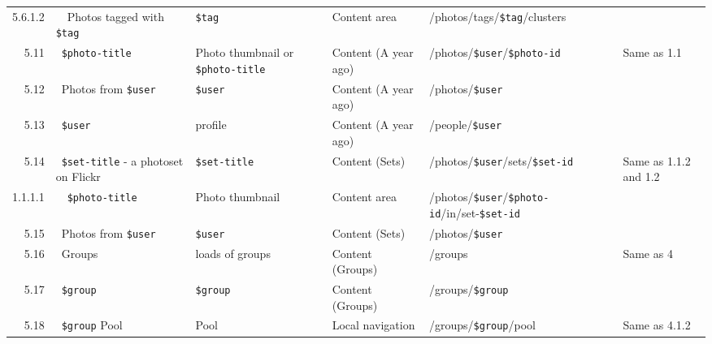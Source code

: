 \documentclass[12pt,a4paper]{article}
\newcommand{\var}[1]{\texttt{\${#1}}}
\begin{document}
\begin{landscape}
\begin{table}[h!b!p!]
\begin{center}
\begin{tiny}
\begin{tabular}{r|l|l|l|l|p{3cm}}
                5.6.1.2 &
                ~~Photos tagged with \var{tag} &
                \var{tag} &
                Content area &
                /photos/tags/\var{tag}/clusters &
                \\

              5.11 &
              ~\var{photo-title} &
              Photo thumbnail or \var{photo-title} &
              Content (A year ago) &
              /photos/\var{user}/\var{photo-id} &
              Same as 1.1 \\

              5.12 &
              ~Photos from \var{user} &
              \var{user} &
              Content (A year ago) &
              /photos/\var{user} &
              \\

              5.13 &
              ~\var{user} &
              profile &
              Content (A year ago) &
              /people/\var{user} &
              \\

              5.14 &
              ~\var{set-title} - a photoset on Flickr &
              \var{set-title} &
              Content (Sets) &
              /photos/\var{user}/sets/\var{set-id} &
              Same as 1.1.2 and 1.2 \\

                1.1.1.1 &
                ~~\var{photo-title} &
                Photo thumbnail &
                Content area &
                /photos/\var{user}/\var{photo-id}/in/set-\var{set-id} &
                \\

              5.15 &
              ~Photos from \var{user} &
              \var{user} &
              Content (Sets) &
              /photos/\var{user} &
              \\

              5.16 &
              ~Groups &
              loads of groups &
              Content (Groups) &
              /groups &
              Same as 4\\

              5.17 &
              ~\var{group} &
              \var{group} &
              Content (Groups) &
              /groups/\var{group} &
              \\

              5.18 &
              ~\var{group} Pool &
              Pool &
              Local navigation &
              /groups/\var{group}/pool &
              Same as 4.1.2 \\


\end{tabular}
\end{tiny}
\end{center}
\end{table}
\end{landscape}
\end{document}
